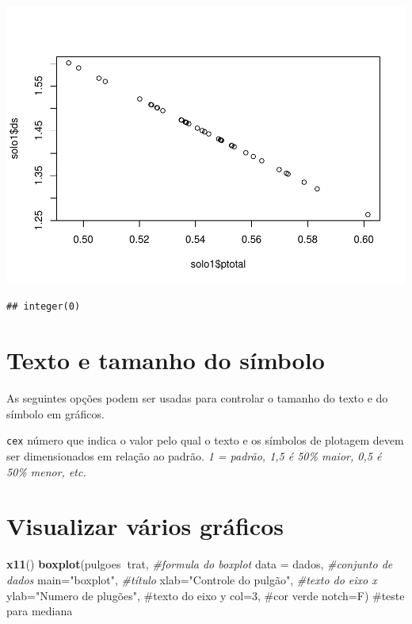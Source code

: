 \documentclass[]{book}
\newenvironment{Shaded}{\begin{snugshade}}{\end{snugshade}}
\newcommand{\CommentTok}[1]{\textcolor[rgb]{0.56,0.35,0.01}{\textit{#1}}}
\newcommand{\DataTypeTok}[1]{\textcolor[rgb]{0.13,0.29,0.53}{#1}}
\newcommand{\KeywordTok}[1]{\textcolor[rgb]{0.13,0.29,0.53}{\textbf{#1}}}
\newcommand{\NormalTok}[1]{#1}
\newcommand{\OperatorTok}[1]{\textcolor[rgb]{0.81,0.36,0.00}{\textbf{#1}}}
\newcommand{\StringTok}[1]{\textcolor[rgb]{0.31,0.60,0.02}{#1}}
\begin{document}
\includegraphics{TudodoR_files/figure-latex/unnamed-chunk-177-1.pdf}

\begin{verbatim}
## integer(0)
\end{verbatim}

\hypertarget{texto-e-tamanho-do-simbolo}{%
\section{Texto e tamanho do símbolo}\label{texto-e-tamanho-do-simbolo}}

As seguintes opções podem ser usadas para controlar o tamanho do texto e do símbolo em gráficos.

\texttt{cex} número que indica o valor pelo qual o texto e os símbolos de plotagem devem ser dimensionados em relação ao padrão.
\emph{1 = padrão, 1,5 é 50\% maior, 0,5 é 50\% menor, etc.}

\hypertarget{visualizar-varios-graficos}{%
\section{Visualizar vários gráficos}\label{visualizar-varios-graficos}}

\begin{Shaded}
\begin{Highlighting}[]
\KeywordTok{x11}\NormalTok{()}
\KeywordTok{boxplot}\NormalTok{(pulgoes}\OperatorTok{~}\NormalTok{trat,              }\CommentTok{#formula do boxplot}
        \DataTypeTok{data =}\NormalTok{ dados,              }\CommentTok{#conjunto de dados}
        \DataTypeTok{main=}\StringTok{"boxplot"}\NormalTok{,            }\CommentTok{#título}
        \DataTypeTok{xlab=}\StringTok{"Controle do pulgão"}\NormalTok{, }\CommentTok{#texto do eixo x }
        \DataTypeTok{ylab=}\StringTok{"Numero de plugões",  #texto do eixo y}
\StringTok{        col=3,                     #cor verde  }
\StringTok{        notch=F)                   #teste para mediana}
\end{Highlighting}
\end{Shaded}
\end{document}
